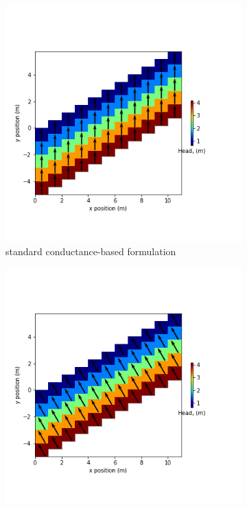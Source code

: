 \documentclass{article}
\begin{document}
\begin{figure}[H]
\centering
\begin{subfigure}{0.4\textwidth}
	\includegraphics[width=\textwidth]{../figures/disu-s-nocc-cf-head.png}
	\caption{standard conductance-based formulation}
	\label{fig:disu-s-nocc-cf-head.}
\end{subfigure}
\hfill
\begin{subfigure}{0.4\textwidth}
	\includegraphics[width=\textwidth]{../figures/disu-x-nocc-cf-head.png}

\end{subfigure}
\end{figure}
\end{document}
